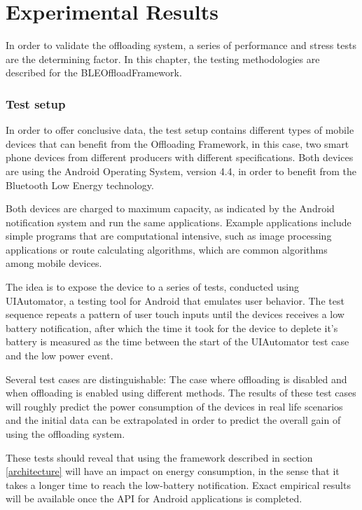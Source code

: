\chapter{Experimental Results}
\label{chapter:results}

In order to validate the offloading system, a series of performance and stress tests are the determining factor. In this chapter, the testing methodologies are described for the BLEOffloadFramework.

\subsection{Test setup}

In order to offer conclusive data, the test setup contains different types of mobile devices that can benefit from the Offloading Framework, in this case, two smart phone devices from different producers with different specifications. Both devices are using the Android Operating System, version 4.4, in order to benefit from the Bluetooth Low Energy technology.

Both devices are charged to maximum capacity, as indicated by the Android notification system and run the same applications. Example applications include simple programs that are computational intensive, such as image processing applications or route calculating algorithms, which are common algorithms among mobile devices.

The idea is to expose the device to a series of tests, conducted using UIAutomator, a testing tool for Android that emulates user behavior. The test sequence repeats a pattern of user touch inputs until the devices receives a low battery notification, after which the time it took for the device to deplete it's battery is measured as the time between the start of the UIAutomator test case and the low power event.

Several test cases are distinguishable: The case where offloading is disabled and when offloading is enabled using different methods. The results of these test cases will roughly predict the power consumption of the devices in real life scenarios and the initial data can be extrapolated in order to predict the overall gain of using the offloading system.

These tests should reveal that using the framework described in section \ref{architecture} will have an impact on energy consumption, in the sense that it takes a longer time to reach the low-battery notification. Exact empirical results will be available once the API for Android applications is completed.
